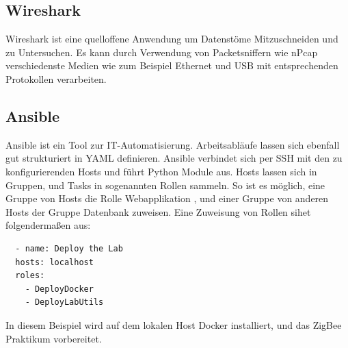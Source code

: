 \subsection{Wireshark}

Wireshark ist eine quelloffene Anwendung um Datenstöme Mitzuschneiden und zu Untersuchen. Es kann durch Verwendung
von Packetsniffern wie nPcap verschiedenste Medien wie zum Beispiel Ethernet und USB mit entsprechenden Protokollen
verarbeiten.


\subsection{Ansible}

Ansible ist ein Tool zur IT-Automatisierung. Arbeitsabläufe lassen sich ebenfall gut strukturiert in YAML definieren. Ansible verbindet sich per SSH 
mit den zu konfigurierenden Hosts und führt Python Module aus. Hosts lassen sich in Gruppen, und Tasks in sogenannten Rollen sammeln. So ist es möglich,
eine Gruppe von Hosts die Rolle \grqq Webapplikation \grqq{}, und einer Gruppe von anderen Hosts der Gruppe \grqq Datenbank \grqq{} zuweisen. 
Eine Zuweisung von Rollen sihet folgendermaßen aus:
\begin{lstlisting}
  - name: Deploy the Lab
  hosts: localhost
  roles:
    - DeployDocker
    - DeployLabUtils
\end{lstlisting}

In diesem Beispiel wird auf dem lokalen Host Docker installiert, und das ZigBee Praktikum vorbereitet.

\subsection{}
